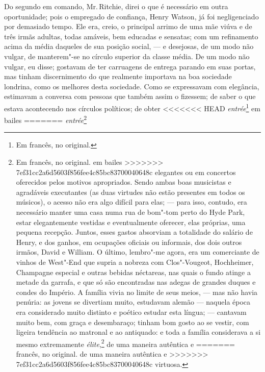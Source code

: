 {{{{{{{{{{{{{{{{{{{{{{{{{{{{{{{{{{{{{{{{{{{{{{{{{{{{{{{{{{{{{{{{{{{{{{{%
Do segundo em comando, Mr.\,Ritchie, direi o que é necessário em
outra oportunidade; pois o empregado de confiança, Henry Watson, já foi
negligenciado por demasiado tempo. Ele era, creio, o principal arrimo de
uma mãe viúva e de três irmãs adultas, todas amáveis, bem educadas e
sensatas; com um refinamento acima da média daqueles de sua posição
social, --- e desejosas, de um modo não vulgar, de manterem"-se no círculo
superior da classe média. De um modo não vulgar, eu disse; gostavam de
ter carruagens de entrega parando em suas portas, mas tinham
discernimento do que realmente importava na boa sociedade londrina, como
os melhores desta sociedade. Como se expressavam com elegância,
estimavam a conversa com pessoas que também assim o fizessem; de saber o
que estava acontecendo nos círculos políticos; de obter
<<<<<<< HEAD
\textit{entrée}\footnote{Em francês, no original.} em bailes
=======
\textit{entrée}\footnote{Em francês, no original.  em bailes
>>>>>>> 7ef31cc2a6d5603f856fee4c85bc83700040648c
elegantes ou em concertos oferecidos pelos motivos apropriados. Sendo
ambas boas musicistas e agradáveis executantes (as duas virtudes não
estão presentes em todos os músicos), o acesso não era algo difícil para
elas; --- para isso, contudo, era necessário manter uma casa numa rua de
bom"-tom perto do Hyde Park, estar elegantemente vestidas e eventualmente
oferecer, elas próprias, uma pequena recepção. Juntos, esses gastos
absorviam a totalidade do salário de Henry, e dos ganhos, em ocupações
oficiais ou informais, dos dois outros irmãos, David e William. O
último, lembro"-me agora, era um comerciante de vinhos de West"-End que
supria a nobreza com Clos"-Vougeot, Hochheimer, Champagne especial e
outras bebidas néctareas, nas quais o fundo atinge a metade da garrafa,
e que só são encontradas nas adegas de grandes duques e condes do
Império. A família vivia no limite de seus meios, --- mas não havia
penúria: as jovens se divertiam muito, estudavam alemão --- naquela época
era considerado muito distinto e poético estudar esta língua; ---
cantavam muito bem, com graça e desembaraço; tinham bom gosto ao se
vestir, com ligeira tendência ao matronal e ao antiquado: e toda a
família considerava a si mesmo extremamente \textit{élite},\footnote{Em
<<<<<<< HEAD
  francês, no original.} de uma maneira autêntica e
=======
  francês, no original.  de uma maneira autêntica e
>>>>>>> 7ef31cc2a6d5603f856fee4c85bc83700040648c
virtuosa.

}}}}}}}}}}}}}}}}}}}}}}}}}}}}}}}}}}}}}}}}}}}}}}}}}}}}}}}}}}}}}}}}}}}}}}}}
